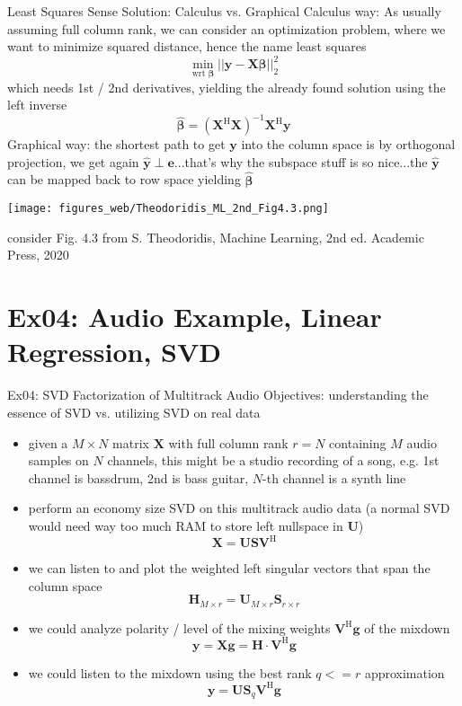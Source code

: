 \documentclass[mathserif, aspectratio=43]{intbeamer}
\begin{document}
\begin{frame}{Least Squares Sense Solution: Calculus vs. Graphical}
Calculus way: As usually assuming full column rank, we can consider an optimization problem, where we want to minimize
squared distance, hence the name least squares
$$\min_{\text{wrt }\bm{\beta}} ||\bm{y} - \bm{X} \bm{\beta}||_2^2$$
which needs 1st / 2nd derivatives, yielding the already found solution using the left inverse
$$\hat{\bm{\beta}} = (\bm{X}^\mathrm{H}\bm{X})^{-1} \bm{X}^\mathrm{H} \bm{y}$$
Graphical way: the shortest path to get $\bm{y}$ into the column space is by orthogonal projection, we get again $\hat{\bm{y}} \perp \bm{e}$...that's why the subspace
stuff is so nice...the $\hat{\bm{y}}$ can be mapped back to row space yielding $\hat{\bm{\beta}}$
\begin{center}
\texttt{[image: figures\_web/Theodoridis\_ML\_2nd\_Fig4.3.png]}
\end{center}
\begin{footnotesize}consider Fig. 4.3 from S. Theodoridis, Machine Learning, 2nd ed. Academic Press, 2020\end{footnotesize}
\end{frame}

\section{Ex04: Audio Example, Linear Regression, SVD}
\begin{frame}{Ex04: SVD Factorization of Multitrack Audio}
Objectives: understanding the essence of SVD vs. utilizing SVD on real data

\begin{itemize}
\item given a $M \times N$ matrix $\bm{X}$ with full column rank $r=N$ containing $M$ audio samples on $N$ channels, this might be a studio recording of a song, e.g. 1st channel is bassdrum, 2nd is bass guitar, $N$-th channel is a synth line
\item perform an economy size SVD on this multitrack audio data (a normal SVD would need way too much RAM to store left nullspace in $\bm{U}$)
$$\bm{X} = \bm{U} \bm{S} \bm{V}^\mathrm{H}$$
\item we can listen to and plot the weighted left singular vectors that span the column space
$$\mathbf{H}_{M \times r} =  \mathbf{U}_{M \times r} \mathbf{S}_{r \times r}$$
\item we could analyze polarity / level of the mixing weights $\mathbf{V}^\mathrm{H} \mathbf{g}$ of the mixdown
$$\mathbf{y} = \mathbf{X}\mathbf{g} = \mathbf{H} \cdot \mathbf{V}^\mathrm{H} \mathbf{g}$$
\item we could listen to the mixdown using the best rank $q<=r$ approximation
$$\mathbf{y} =\bm{U} \bm{S}_q \bm{V}^\mathrm{H}\mathbf{g}$$
\end{itemize}

\end{frame}
\end{document}
